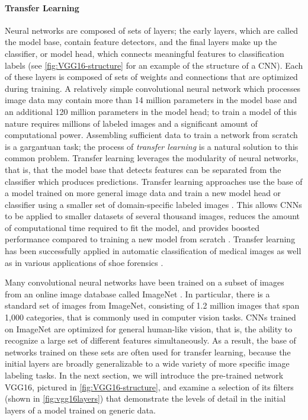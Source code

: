 \documentclass{article}\usepackage[]{graphicx}\usepackage[table]{xcolor}
\begin{document}
\paragraph{Transfer Learning}
Neural networks are composed of sets of layers; the early layers, which are called the model base, contain feature detectors, and the final layers make up the classifier, or model head, which connects meaningful features to classification labels (see \autoref{fig:VGG16-structure} for an example of the structure of a CNN). Each of these layers is composed of sets of weights and connections that are optimized during training. A relatively simple convolutional neural network which processes image data may contain more than 14 million parameters in the model base and an additional 120 million parameters in the model head; to train a model of this nature requires millions of labeled images and a significant amount of computational power. Assembling sufficient data to train a network from scratch is a gargantuan task; the process of \emph{transfer learning} is a natural solution to this common problem. Transfer learning leverages the modularity of neural networks, that is, that the model base that detects features can be separated from the classifier which produces predictions. Transfer learning approaches use the base of a model trained on more general image data and train a new model head or classifier using a smaller set of domain-specific labeled images \citep{oquabLearningTransferringMidlevel2014}. This allows CNNs to be applied to smaller datasets of several thousand images, reduces the amount of computational time required to fit the model, and provides boosted performance compared to training a new model from scratch \citep{yosinskiHowTransferableAre2014}. Transfer learning has been successfully applied in automatic classification of medical images \citep{shinDeepConvolutionalNeural2016} as well as in various applications of shoe forensics \citep{kongCrossDomainForensicShoeprint2017,kongCrossDomainImageMatching2019a,zhangAdaptingConvolutionalNeural2017}.

Many convolutional neural networks have been trained on a subset of images from an online image database called ImageNet \citep{dengImageNetLargeScaleHierarchical}. In particular, there is a standard set of images from ImageNet, consisting of 1.2 million images that span 1,000 categories, that is commonly used in computer vision tasks. CNNs trained on ImageNet are optimized for general human-like vision, that is, the ability to recognize a large set of different features simultaneously. As a result, the base of networks trained on these sets are often used for transfer learning, because the initial layers are broadly generalizable to a wide variety of more specific image labeling tasks. In the next section, we will introduce the pre-trained network VGG16, pictured in \autoref{fig:VGG16-structure}, and examine a selection of its filters (shown in \autoref{fig:vgg16layers}) that demonstrate the levels of detail in the initial layers of a model trained on generic data.
\end{document}
